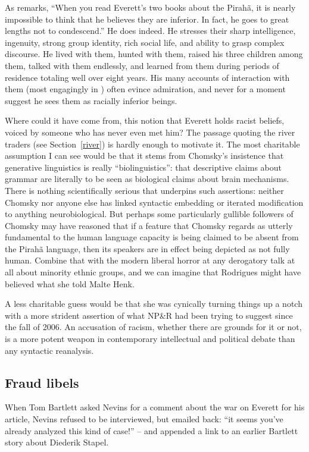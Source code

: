 \documentclass[output=paper,colorlinks,citecolor=brown
]{langscibook}
\begin{document}
As \citet{Bartlett12} remarks, ``When you read Everett’s two books about
the Pirah{\~a}, it is nearly impossible to think that he believes they
are inferior. In fact, he goes to great lengths not to condescend.''
He does indeed.  He stresses their sharp intelligence, ingenuity, strong
group identity, rich social life, and ability to grasp complex discourse.
He lived with them, hunted with them, raised his three children among
them, talked with them endlessly, and learned from them during periods
of residence totaling well over eight years. His many accounts of
interaction with them (most engagingly in \citealt{Everett08}) often
evince admiration, and never for a moment suggest he sees them as
racially inferior beings.

Where could it have come from, this notion that Everett holds racist
beliefs, voiced by someone who has never even met him? The passage
quoting the river traders (see Section~\ref{river}) is hardly
enough to motivate it. The most charitable assumption I can see
would be that it stems from Chomsky's insistence that generative
linguistics is really ``biolinguistics'': that descriptive claims about
grammar are literally to be seen as biological claims about brain
mechanisms. There is nothing scientifically serious that underpins
such assertions: neither Chomsky nor anyone else has linked syntactic
embedding or iterated modification to anything neurobiological. But
perhaps some particularly gullible followers of Chomsky may have
reasoned that if a feature that Chomsky regards as utterly fundamental
to the human language capacity is being claimed to be absent from the
Pirah{\~a} language, then its speakers are in effect being depicted as
not fully human. Combine that with the modern liberal horror at any
derogatory talk at all about minority ethnic groups, and we can
imagine that Rodrigues might have believed what she told Malte Henk.

A less charitable guess would be that she was cynically turning things
up a notch with a more strident assertion of what NP\&R had been trying
to suggest since the fall of 2006. An accusation of racism, whether
there are grounds for it or not, is a more potent weapon in contemporary
intellectual and political debate than any syntactic reanalysis.

\subsection{Fraud libels}

When Tom Bartlett asked Nevins for a comment about the war on Everett
for his \citeyear{Bartlett12} article, Nevins refused to be interviewed,
but emailed back: ``it seems you've already analyzed this kind of case!''
-- and appended a link to an earlier Bartlett story about Diederik
Stapel.
\end{document}
